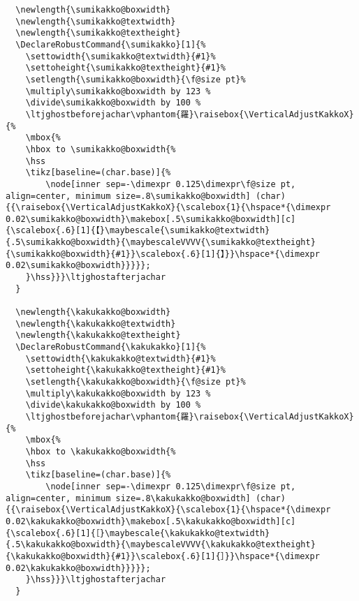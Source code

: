 \documentclass[luatex,fontsize=10pt,paper=b5,twoside]{jlreq}%
\begin{document}
\begin{lstlisting}
  \newlength{\sumikakko@boxwidth}
  \newlength{\sumikakko@textwidth}
  \newlength{\sumikakko@textheight}
  \DeclareRobustCommand{\sumikakko}[1]{%
    \settowidth{\sumikakko@textwidth}{#1}%
    \settoheight{\sumikakko@textheight}{#1}%
    \setlength{\sumikakko@boxwidth}{\f@size pt}%
    \multiply\sumikakko@boxwidth by 123 %
    \divide\sumikakko@boxwidth by 100 %
    \ltjghostbeforejachar\vphantom{羅}\raisebox{\VerticalAdjustKakkoX}{%
    \mbox{%
    \hbox to \sumikakko@boxwidth{%
    \hss
    \tikz[baseline=(char.base)]{%
        \node[inner sep=-\dimexpr 0.125\dimexpr\f@size pt, align=center, minimum size=.8\sumikakko@boxwidth] (char) {{\raisebox{\VerticalAdjustKakkoX}{\scalebox{1}{\hspace*{\dimexpr 0.02\sumikakko@boxwidth}\makebox[.5\sumikakko@boxwidth][c]{\scalebox{.6}[1]{【}\maybescale{\sumikakko@textwidth}{.5\sumikakko@boxwidth}{\maybescaleVVVV{\sumikakko@textheight}{\sumikakko@boxwidth}{#1}}\scalebox{.6}[1]{】}}\hspace*{\dimexpr 0.02\sumikakko@boxwidth}}}}};
    }\hss}}}\ltjghostafterjachar
  }

  \newlength{\kakukakko@boxwidth}
  \newlength{\kakukakko@textwidth}
  \newlength{\kakukakko@textheight}
  \DeclareRobustCommand{\kakukakko}[1]{%
    \settowidth{\kakukakko@textwidth}{#1}%
    \settoheight{\kakukakko@textheight}{#1}%
    \setlength{\kakukakko@boxwidth}{\f@size pt}%
    \multiply\kakukakko@boxwidth by 123 %
    \divide\kakukakko@boxwidth by 100 %
    \ltjghostbeforejachar\vphantom{羅}\raisebox{\VerticalAdjustKakkoX}{%
    \mbox{%
    \hbox to \kakukakko@boxwidth{%
    \hss
    \tikz[baseline=(char.base)]{%
        \node[inner sep=-\dimexpr 0.125\dimexpr\f@size pt, align=center, minimum size=.8\kakukakko@boxwidth] (char) {{\raisebox{\VerticalAdjustKakkoX}{\scalebox{1}{\hspace*{\dimexpr 0.02\kakukakko@boxwidth}\makebox[.5\kakukakko@boxwidth][c]{\scalebox{.6}[1]{［}\maybescale{\kakukakko@textwidth}{.5\kakukakko@boxwidth}{\maybescaleVVVV{\kakukakko@textheight}{\kakukakko@boxwidth}{#1}}\scalebox{.6}[1]{］}}\hspace*{\dimexpr 0.02\kakukakko@boxwidth}}}}};
    }\hss}}}\ltjghostafterjachar
  }


\end{lstlisting}
\end{document}
